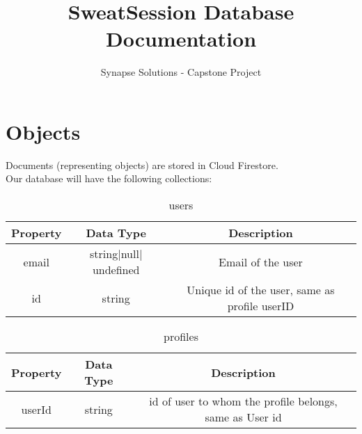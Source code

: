 \documentclass[12pt, letterpaper]{article}
\title{SweatSession Database Documentation}
\author{Synapse Solutions - Capstone Project}
\begin{document}
\maketitle
\section*{Objects}
Documents (representing objects) are stored in Cloud Firestore.\\ Our database will have the following collections:
    
    \begin{table}[ht]
      \centering
      \caption{users}
      \begin{tabular}{||c c c||} 
        \hline
        Property & Data Type & Description \\ [0.5ex] 
        \hline\hline
        email & string$|$null$|$undefined & Email of the user\\
        id & string & Unique id of the user, same as profile userID\\
        
        \hline
      \end{tabular}
      \label{table:data}
    \end{table}
    
    \begin{table}[ht]
      \centering
      \caption{profiles}
      \begin{tabular}{||c c c||} 
        \hline
        Property & Data Type & Description \\ [0.1ex] 
        \hline\hline
        userId & string & id of user to whom the profile belongs, same as User id\\
        
        \hline
      \end{tabular}
      \label{table:data}
    \end{table}
    
\end{document}
